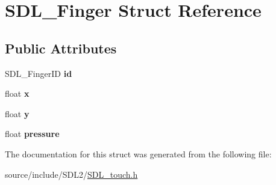\hypertarget{struct_s_d_l___finger}{}\section{S\+D\+L\+\_\+\+Finger Struct Reference}
\label{struct_s_d_l___finger}
\subsection*{Public Attributes}
\begin{DoxyCompactItemize}
\item 
\hypertarget{struct_s_d_l___finger_a3cec630146eeec5bd6299a9387a6f16a}{}S\+D\+L\+\_\+\+Finger\+I\+D {\bfseries id}\label{struct_s_d_l___finger_a3cec630146eeec5bd6299a9387a6f16a}

\item 
\hypertarget{struct_s_d_l___finger_ab91dfbd03c3215560457fef44e1c7755}{}float {\bfseries x}\label{struct_s_d_l___finger_ab91dfbd03c3215560457fef44e1c7755}

\item 
\hypertarget{struct_s_d_l___finger_a0a2c7a06ae641940111e03801c672cf9}{}float {\bfseries y}\label{struct_s_d_l___finger_a0a2c7a06ae641940111e03801c672cf9}

\item 
\hypertarget{struct_s_d_l___finger_a0ecb50c7fd699d59899ac60c941bdee6}{}float {\bfseries pressure}\label{struct_s_d_l___finger_a0ecb50c7fd699d59899ac60c941bdee6}

\end{DoxyCompactItemize}


The documentation for this struct was generated from the following file\+:\begin{DoxyCompactItemize}
\item 
source/include/\+S\+D\+L2/\hyperlink{_s_d_l__touch_8h}{S\+D\+L\+\_\+touch.\+h}\end{DoxyCompactItemize}
